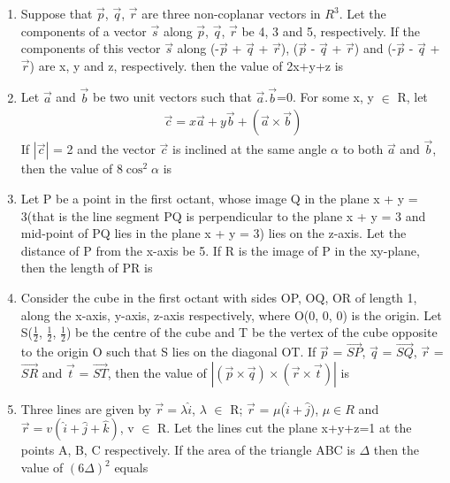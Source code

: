 \begin{enumerate}[label=\arabic*.,ref=\thesubsection.\theenumi]
\item Suppose that $\overrightarrow{p}$, $\overrightarrow{q}$, $\overrightarrow{r}$ are three non-coplanar vectors in $R^{3}$. Let the components of a vector $\overrightarrow{s}$ along $\overrightarrow{p}$, $\overrightarrow{q}$,  
$\overrightarrow{r}$ be 4, 3 and 5, respectively. If the components of this vector $\overrightarrow{s}$ along 
(-$\overrightarrow{p}$ + $\overrightarrow{q}$ + $\overrightarrow{r}$), ($\overrightarrow{p}$ - $\overrightarrow{q}$ + $\overrightarrow{r}$) and (-$\overrightarrow{p}$ - $\overrightarrow{q}$ + $\overrightarrow{r}$) are x, y and z, respectively. then the value of 2x+y+z is

\item Let $\overrightarrow{a}$ and $\overrightarrow{b}$ be two unit vectors such that $\overrightarrow{a}$.$\overrightarrow{b}$=0. For some x, y $\in$ R, let 
\begin{align*}
\overrightarrow{c} = x\overrightarrow{a} + y\overrightarrow{b} + (\overrightarrow{a} \times \overrightarrow{b})
\end{align*}
If $|\overrightarrow{c}|$ = 2 and the vector $\overrightarrow{c}$ is inclined at the same angle $\alpha$ to both $\overrightarrow{a}$ and $\overrightarrow{b}$, then the value of 8$\cos^{2}\alpha$ is

\item Let P be a point in the first octant, whose image Q in the plane x + y = 3(that is the line segment PQ is perpendicular to the plane x + y = 3 and mid-point of PQ lies in the plane x + y = 3) lies on the z-axis. Let the distance of P from the x-axis be 5. If R is the image of P in the xy-plane, then the length of PR is

\item Consider the cube in the first octant with sides OP, OQ, OR of length 1, along the x-axis, y-axis, z-axis respectively, where O(0, 0, 0) is the origin. Let S($\frac{1}{2}$, $\frac{1}{2}$, $\frac{1}{2}$) be the centre of the cube and T be the vertex of the cube opposite to the origin O such that S lies on the diagonal OT. If 
$\overrightarrow{p}$ = $\overrightarrow{SP}$, $\overrightarrow{q}$ = $\overrightarrow{SQ}$, $\overrightarrow{r}$ = $\overrightarrow{SR}$ and $\overrightarrow{t}$ = $\overrightarrow{ST}$, then the value of $|(\overrightarrow{p} \times \overrightarrow{q}) \times (\overrightarrow{r} \times \overrightarrow{t})|$ is

\item Three lines are given by $\overrightarrow{r} = \lambda\hat{i}$, $\lambda$ $\in$ R; $\overrightarrow{r}$ = $\mu$($\hat{i} + \hat{j}$), $\mu \in R$ and $\overrightarrow{r} = v(\hat{i}+\hat{j}+\hat{k})$, v $\in$ R. Let the lines cut the plane x+y+z=1 at the points A, B, C respectively. If the area of the triangle ABC is $\Delta$ then the value of $(6\Delta)^{2}$ equals


\end{enumerate}
